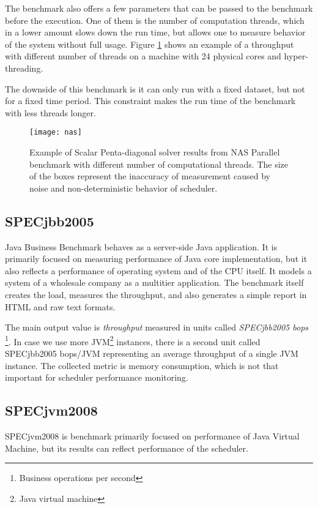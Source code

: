 The benchmark also offers a few parameters that can be passed to the benchmark
before the execution. One of them is the number of computation threads, which in
a lower amount slows down the run time, but allows one to measure behavior of
the system without full usage. Figure \ref{fig:nas} shows an example of a
throughput with different number of threads on a machine with 24 physical cores
and hyper-threading.

The downside of this benchmark is it can only run with a fixed dataset, but not
for a fixed time period. This constraint makes the run time of the benchmark
with less threads longer.

\begin{figure}
  \centering
  \texttt{[image: nas]}
  \caption{Example of Scalar Penta-diagonal solver results from NAS Parallel
    benchmark with different number of computational threads. The size of the
    boxes represent the inaccuracy of measurement caused by noise and
    non-deterministic behavior of scheduler.}
  \label{fig:nas}
\end{figure}

\subsection{SPECjbb2005}
Java Business Benchmark behaves as a server-side Java application. It is
primarily focused on measuring performance of Java core implementation, but it
also reflects a performance of operating system and of the CPU itself. It models
a system of a wholesale company as a multitier application. The benchmark itself
creates the load, measures the throughput, and also generates a simple report in
HTML and raw text formats.

The main output value is \emph{throughput} measured in units called
\emph{SPECjbb2005 bops} \footnote{Business operations per second}. In case we
use more JVM\footnote{Java virtual machine} instances, there is a second unit
called SPECjbb2005 bops/JVM representing an average throughput of a single JVM
instance. The collected metric is memory consumption, which is not that
important for scheduler performance monitoring.

\subsection{SPECjvm2008}
SPECjvm2008 is benchmark primarily focused on performance of Java Virtual
Machine, but its results can reflect performance of the scheduler.

